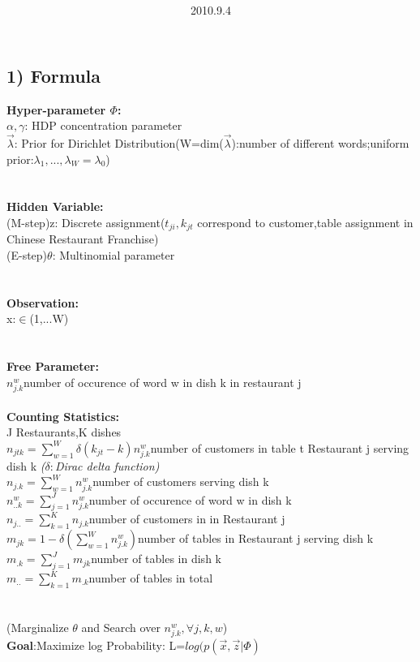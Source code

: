 \documentclass{article}
\title{\vspace{0.3in}\textmd{\textbf{\hmwkTitle}}}
\date{2010.9.4}
\author{\textbf{\hmwkAuthorName}}
\begin{document}
\begin{spacing}{1.1}
\maketitle
\section{1) Formula }
{\bf Hyper-parameter $\Phi$:}\\
$\alpha,\gamma$: HDP concentration parameter\\
$\vec \lambda$: Prior for Dirichlet Distribution(W=dim($\vec \lambda$):number of different words;uniform prior:$\lambda_{1},...,\lambda_{W}=\lambda_{0}$)\\ \\ \\
{\bf Hidden Variable:}\\
(M-step)z: Discrete assignment($t_{ji},k_{jt}$ correspond to customer,table assignment in Chinese Restaurant Franchise)\\
(E-step)$\theta$: Multinomial parameter\\ \\ \\
{\bf Observation:}\\
x:$\in$(1,...W)\\ \\ \\
{\bf Free Parameter:}\\
$n_{j.k}^{w}$number of occurence of word w in dish k in restaurant j\\ \\
{\bf Counting Statistics:}\\
J Restaurants,K dishes\\
$n_{jtk}=\sum_{w=1}^{W} \delta(k_{jt}-k)n_{j.k}^{w}$number of customers in table t Restaurant j serving dish k \emph{{\small($\delta:$Dirac delta function)}}\\
$n_{j.k}=\sum_{w=1}^{W} n_{j.k}^{w}$number of customers serving dish k \\
$n_{..k}^{w}=\sum_{j=1}^{J} n_{j.k}^{w}$number of occurence of word w in dish k\\
$n_{j..}=\sum_{k=1}^{K}n_{j.k}$number of customers in in Restaurant j \\
$m_{jk}=1-\delta(\sum_{w=1}^{W} n_{j.k}^{w})$number of tables in Restaurant j serving dish k\\
$m_{.k}=\sum_{j=1}^{J} m_{jk}$number of tables in dish k \\ 
$m_{..}=\sum_{k=1}^{K} m_{.k}$number of tables in total \\ \\ \\
(Marginalize $\theta$ and Search over $n_{j.k}^{w},\forall j,k,w$)\\
{\bf Goal}:Maximize log Probability: L=$log(p(\vec x,\vec z|\Phi)$

\end{spacing}
\end{document}

